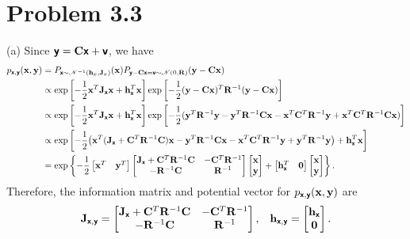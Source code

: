 \documentclass{article}
\newcommand{\bs}[1]{\textsf{\textbf{#1}}}
\newcommand{\bm}{\mathbf}
\begin{document}
\section*{Problem 3.3}
(a) Since $\bs{y} = \bm{C}\bs{x} + \bs{v}$, we have
\begin{align*}
p_{\bs{x}, \bs{y}}(\bm{x}, \bm{y}) &=
P_{\bs{x}\sim\mathscr{N}^{-1}(\bm{h}_x, \bm{J}_x)}(\bm{x})P_{\bs{y}-\bm{C}\bs{x}
=\bs{v}\sim\mathscr{N}(0,\bm{R})}(\bm{y}-\bm{C}\bm{x})\\
&\propto\exp\left[-\frac{1}{2}\bm{x}^T\bm{J}_{\bs{x}}\bm{x}+\bm{h}_\bs{x}^T\bm{x}\right]
\exp\left[-\frac{1}{2}(\bm{y}-\bm{C}\bm{x})^T\bm{R}^{-1}(\bm{y}-\bm{C}\bm{x})\right]\\
&\propto\exp\left[-\frac{1}{2}\bm{x}^T\bm{J}_{\bs{x}}\bm{x}+\bm{h}_\bs{x}^T\bm{x}\right]
\exp\left[-\frac{1}{2}(\bm{y}^T\bm{R}^{-1}\bm{y} - \bm{y}^T\bm{R}^{-1}\bm{C}\bm{x} - \bm{x}^T\bm{C}^T\bm{R}^{-1}\bm{y}
+ \bm{x}^T\bm{C}^T\bm{R}^{-1}\bm{C}\bm{x})\right]\\
&\propto\exp\left[-\frac{1}{2}\big(
\bm{x}^T(\bm{J}_\bs{x}+\bm{C}^T\bm{R}^{-1}\bm{C})\bm{x}
- \bm{y}^T\bm{R}^{-1}\bm{C}\bm{x}
-\bm{x}^T\bm{C}^T\bm{R}^{-1}\bm{y}
+\bm{y}^T\bm{R}^{-1}\bm{y}\big)
+ \bm{h}_\bs{x}^T\bm{x}\right]\\
& = \exp\left\{
-\frac{1}{2}
\begin{bmatrix}
    \bm{x}^T & \bm{y}^T
\end{bmatrix}
\begin{bmatrix}
    \bm{J}_\bs{x}+\bm{C}^T\bm{R}^{-1}\bm{C} & -\bm{C}^T\bm{R}^{-1} \\
    -\bm{R}^{-1}\bm{C} & \bm{R}^{-1}
\end{bmatrix}
\begin{bmatrix}
    \bm{x} \\
    \bm{y}
\end{bmatrix}
+ 
\begin{bmatrix}
    \bm{h}_{\bs{x}}^T & \bm{0}
\end{bmatrix}
\begin{bmatrix}
    \bm{x} \\
    \bm{y}
\end{bmatrix}
\right\}.
\end{align*}
Therefore, the information matrix and potential vector for $p_{\bs{x}, \bs{y}}(\bm{x}, \bm{y})$ are
\begin{align*}
	\bm{J}_{\bs{x}, \bs{y}} = \begin{bmatrix}
    \bm{J}_\bs{x}+\bm{C}^T\bm{R}^{-1}\bm{C} & -\bm{C}^T\bm{R}^{-1} \\
    -\bm{R}^{-1}\bm{C} & \bm{R}^{-1}
\end{bmatrix},\;\;\;
\bm{h}_{\bs{x}, \bs{y}} = 
\begin{bmatrix}
    \bm{h}_{\bs{x}} \\
    \bm{0}
\end{bmatrix}.
\end{align*}
\end{document}
